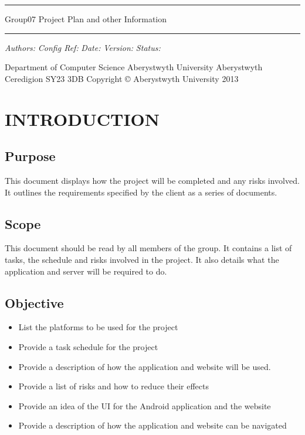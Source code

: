 \documentclass[12pt]{article}
\begin{document}
\pagestyle{fancy}
\begin{flushleft}
\rule[0.5cm]{13.8cm}{0.1cm}
\end{flushleft}
{\fontsize{20}{20}\selectfont Group07 Project Plan and other Information}
\begin{flushleft}
\rule[0.5cm]{13.8cm}{0.1cm}
\end{flushleft}
\begin{flushleft}
\textit{Authors: } \newline
\textit{Config Ref:  } \newline
\textit{Date: } \newline
\textit{Version: } \newline
\textit{Status: }
\end{flushleft}

\vspace{10cm}
Department of Computer Science\newline
Aberystwyth University \newline
Aberystwyth \newline
Ceredigion \newline
SY23 3DB \newline
Copyright © Aberystwyth University 2013


\newpage
\tableofcontents{}
\newpage
\section{INTRODUCTION}
\subsection{Purpose}
This document displays how the project will be completed and any risks involved. It outlines
the requirements specified by the client as a series of documents.
\subsection{Scope}
This document should be read by all members of the group. It contains a list of tasks, the
schedule and risks involved in the project. It also details what the application and server will
be required to do.
\subsection{Objective}
\begin{itemize}
\item List the platforms to be used for the project
\item Provide a task schedule for the project
\item Provide a description of how the application and website will be used.
\item Provide a list of risks and how to reduce their effects
\item Provide an idea of the UI for the Android application and the website
\item Provide a description of how the application and website can be navigated
\end{itemize}
\newpage
\end{document}
